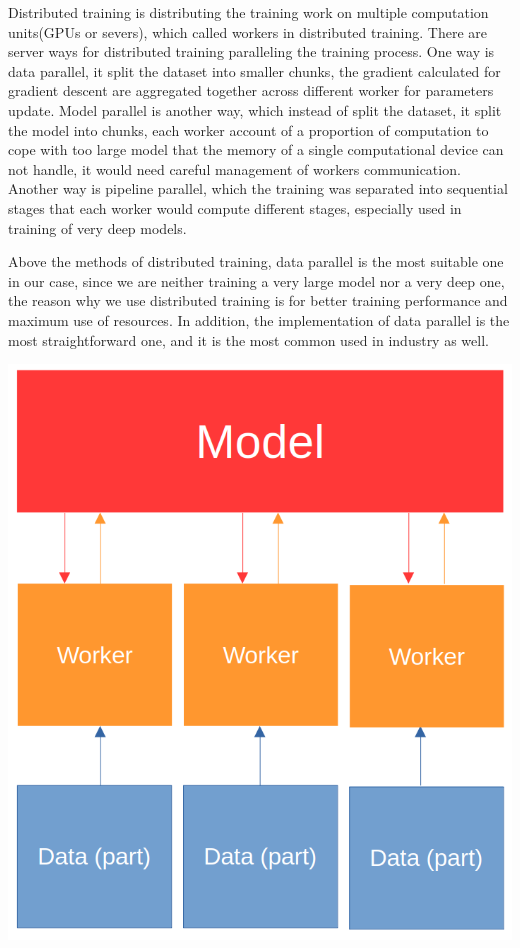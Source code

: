                     Distributed training is distributing the training work on multiple computation units(GPUs or severs), which called workers in distributed training. There are server ways for distributed training paralleling the training process. One way is data parallel, it split the dataset into smaller chunks, the gradient calculated for gradient descent are aggregated together across different worker for parameters update. Model parallel is another way, which instead of split the dataset, it split the model into chunks, each worker account of a proportion of computation to cope with too large model that the memory of a single computational device can not handle, it would need careful management of workers communication. Another way is pipeline parallel, which the training was separated into sequential stages that each worker would compute different stages, especially used in training of very deep models.

                    Above the methods of distributed training, data parallel is the most suitable one in our case, since we are neither training a very large model nor a very deep one, the reason why we use distributed training is for better training performance and maximum use of resources. In addition, the implementation of data parallel is the most straightforward one, and it is the most common used in industry as well.

                    \begin{Figure}
                        \centering
                        \includegraphics[width=0.9\linewidth]{Image/DataPara.png}
                    \end{Figure}

